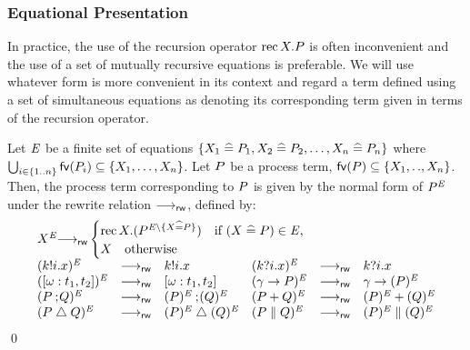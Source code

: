 \subsubsection{Equational Presentation}
In practice, the use of the recursion operator $\rec X.\P$ is often
inconvenient and the use of a set of mutually recursive equations is
preferable.  We will use whatever form is more convenient in its
context and regard a term defined using a set of simultaneous
equations as denoting its corresponding term given in terms of the recursion
operator.
\begin{definition}
Let $\Equ$ be a finite set of equations $\{X_1 \defs P_1, X_2 \defs P_2,
\ldots, X_n \defs P_n\}$ where $\bigcup_{i\in\{1\upto n\}} \fv(P_i)
\subseteq \{X_1,\ldots,X_n\}$. Let $\P$ be a process term, $\fv(\P)
\subseteq \{X_1,\upto,X_n\}$. Then, the process term
corresponding to $\P$ is given by the normal form of $\P^\Equ$ under the
rewrite relation $\goesrw$, defined by:
\[
\begin{array}{llllll}
\multicolumn{6}{l}{
X^\Equ \goesrw \begin{cases} 
           \rec X.(P^{\Equ \setminus \{X \defs P\}}) 
              \quad\text{if $(X \defs P) \in \Equ$,} \\ 
           X  \quad \text{otherwise}
         \end{cases} } \\   
  (\kk!\ii.\xx)^\Equ & \goesrw & \kk!\ii.\xx &
  (\kk?\ii.\xx)^\Equ & \goesrw & \kk?\ii.\xx \\ 
  ([\op:t_1,t_2])^\Equ & \goesrw & [\op:t_1,t_2] & (\g \guard P)^\Equ & \goesrw & \g \guard (P)^\Equ \\  
  (P \seqcomp Q)^\Equ & \goesrw & (P)^\Equ \seqcomp (Q)^\Equ & (P \choice Q)^\Equ
  & \goesrw & (P)^\Equ \choice (Q)^\Equ \\ 
  (P \interrupt Q)^\Equ & \goesrw & (P)^\Equ \interrupt (Q)^\Equ & (P \parallel Q)^\Equ & \goesrw & (P)^\Equ \parallel (Q)^\Equ
\end{array}
\]
\qed
\end{definition}

